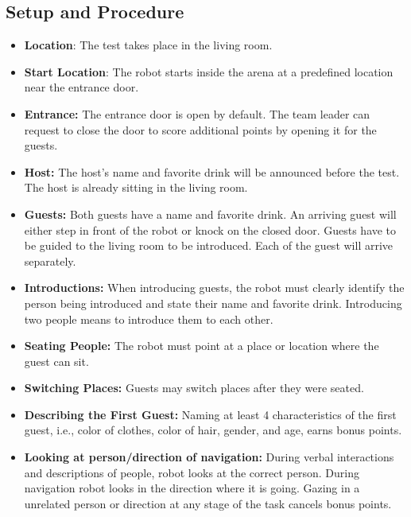 \subsection*{Setup and Procedure}
\begin{itemize}
	\item \textbf{Location}: The test takes place in the living room.
	
	\item \textbf{Start Location}: The robot starts inside the arena at a predefined location near the entrance door.
	
	\item \textbf{Entrance:} The entrance door is open by default. The team leader can request to close the door to score additional points by opening it for the guests.

	\item \textbf{Host:} The host's name and favorite drink will be announced before the test. The host is already sitting in the living room.

	\item \textbf{Guests:} Both guests have a name and favorite drink. An arriving guest will either step in front of the robot or knock on the closed door. Guests have to be guided to the living room to be introduced. Each of the guest will arrive separately.

	\item \textbf{Introductions:} When introducing guests, the robot must clearly identify the person being introduced and state their name and favorite drink. Introducing two people means to introduce them to each other.
	
	\item \textbf{Seating People:} The robot must point at a place or location where the guest can sit.
	
	\item \textbf{Switching Places:} Guests may switch places after they were seated.
	
	\item \textbf{Describing the First Guest:} Naming at least 4 characteristics of the first guest, i.e., color of clothes, color of hair, gender, and age, earns bonus points.
	\item \textbf{Looking at person/direction of navigation:} During verbal interactions and descriptions of people, robot 
	looks at the correct person. During navigation robot looks in the direction where it is going. Gazing in a unrelated 
	person or direction at any stage of the task cancels bonus points. 
\end{itemize}

